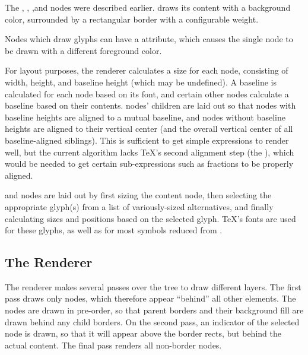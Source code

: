 The , , ,and  nodes were described earlier.  draws its content with a background color, surrounded by a rectangular border with a configurable weight.

Nodes which draw glyphs can have a  attribute, which causes the single node to be drawn with a different foreground color.

For layout purposes, the renderer calculates a size for each node, consisting of width, height, and baseline height (which may be undefined). A baseline is calculated for each  node based on its font, and certain other nodes calculate a baseline based on their contents.  nodes' children are laid out so that nodes with baseline heights are aligned to a mutual baseline, and nodes without baseline heights are aligned to their vertical center (and the overall vertical center of all baseline-aligned siblings). This is sufficient to get simple expressions to render well, but the current algorithm lacks \TeX's second alignment step (the ), which would be needed to get certain sub-expressions such as fractions to be properly aligned.
 
 and  nodes are laid out by first sizing the content node, then selecting the appropriate glyph(s) from a list of variously-sized alternatives, and finally calculating sizes and positions based on the selected glyph. \TeX's fonts are used for these glyphs, as well as for most symbols reduced from . 


\subsection{The Renderer}

The renderer makes several passes over the tree to draw different layers. The first pass draws only  nodes, which therefore appear ``behind'' all other elements. The nodes are drawn in pre-order, so that parent borders and their background fill are drawn behind any child borders. On the second pass, an indicator of the selected node is drawn, so that it will appear above the border rects, but behind the actual content. The final pass renders all non-border nodes.  

